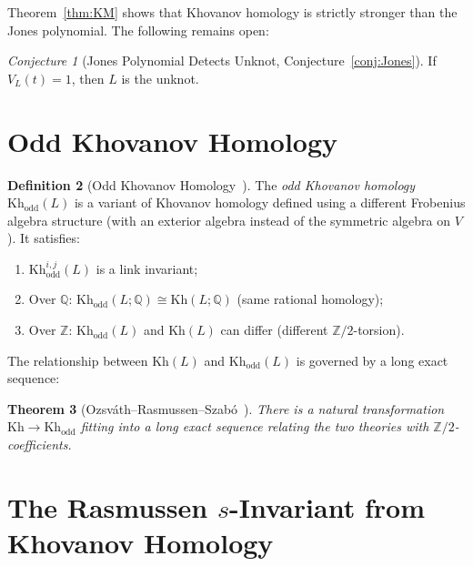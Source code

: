 \documentclass[12pt,a4paper]{amsart}
\newtheorem{theorem}{Theorem}[section]
\theoremstyle{definition}
\newtheorem{definition}[theorem]{Definition}
\theoremstyle{remark}
\newtheorem{conjecture}[theorem]{Conjecture}
\newcommand{\Z}{\mathbb{Z}}
\newcommand{\Q}{\mathbb{Q}}
\begin{document}
Theorem~\ref{thm:KM} shows that Khovanov homology is strictly stronger
than the Jones polynomial. The following remains open:

\begin{conjecture}[Jones Polynomial Detects Unknot, Conjecture~\ref{conj:Jones}]
If $V_L(t) = 1$, then $L$ is the unknot.
\end{conjecture}

\section{Odd Khovanov Homology}

\begin{definition}[Odd Khovanov Homology~\cite{OzsvathRasmussenSzabo2013}]
The \emph{odd Khovanov homology} $\mathrm{Kh}_{\mathrm{odd}}(L)$ is a variant
of Khovanov homology defined using a different Frobenius algebra structure
(with an exterior algebra instead of the symmetric algebra on $V$).
It satisfies:
\begin{enumerate}[label=\roman*)]
\item $\mathrm{Kh}_{\mathrm{odd}}^{i,j}(L)$ is a link invariant;
\item Over $\Q$: $\mathrm{Kh}_{\mathrm{odd}}(L; \Q) \cong \mathrm{Kh}(L; \Q)$
      (same rational homology);
\item Over $\Z$: $\mathrm{Kh}_{\mathrm{odd}}(L)$ and $\mathrm{Kh}(L)$
      can differ (different $\Z/2$-torsion).
\end{enumerate}
\end{definition}

The relationship between $\mathrm{Kh}(L)$ and $\mathrm{Kh}_{\mathrm{odd}}(L)$
is governed by a long exact sequence:

\begin{theorem}[Ozsváth--Rasmussen--Szabó~\cite{OzsvathRasmussenSzabo2013}]
There is a natural transformation $\mathrm{Kh} \to \mathrm{Kh}_{\mathrm{odd}}$
fitting into a long exact sequence relating the two theories with
$\Z/2$-coefficients.
\end{theorem}

\section{The Rasmussen \texorpdfstring{$s$}{s}-Invariant from Khovanov Homology}
\end{document}
